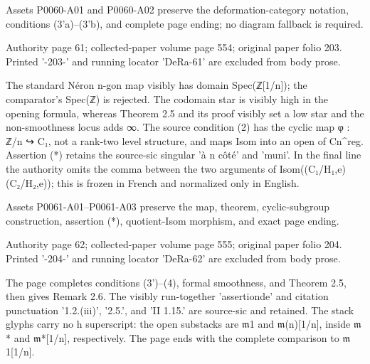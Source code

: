 \documentclass[11pt,a4paper]{article}
\begin{document}
Assets P0060-A01 and P0060-A02 preserve the deformation-category notation, conditions (3'a)--(3'b), and complete page ending; no diagram fallback is required.


\par\medskip
\hypertarget{D018-P0061}{}
\par\smallskip
Authority page 61; collected-paper volume page 554; original paper folio 203. Printed '-203-' and running locator 'DeRa-61' are excluded from body prose.

The standard Néron n-gon map visibly has domain Spec(ℤ[1/n]); the comparator's Spec(ℤ) is rejected. The codomain star is visibly high in the opening formula, whereas Theorem 2.5 and its proof visibly set a low star and the non-smoothness locus adds ∞. The source condition (2) has the cyclic map φ : ℤ/n ↪ C₁, not a rank-two level structure, and maps Isom into an open of C\textunderscore{}n\textasciicircum{}reg. Assertion (*) retains the source-sic singular 'à n côté' and 'muni'. In the final line the authority omits the comma between the two arguments of Isom((C₁/H₁,e)(C₂/H₂,e)); this is frozen in French and normalized only in English.

Assets P0061-A01--P0061-A03 preserve the map, theorem, cyclic-subgroup construction, assertion (*), quotient-Isom morphism, and exact page ending.


\par\medskip
\hypertarget{D018-P0062}{}
\par\smallskip
Authority page 62; collected-paper volume page 555; original paper folio 204. Printed '-204-' and running locator 'DeRa-62' are excluded from body prose.

The page completes conditions (3')--(4), formal smoothness, and Theorem 2.5, then gives Remark 2.6. The visibly run-together 'assertionde' and citation punctuation '1.2.(iii)', '2.5.', and 'II 1.15.' are source-sic and retained. The stack glyphs carry no h superscript: the open substacks are \ensuremath{\mathfrak{m}}\textunderscore{}1 and \ensuremath{\mathfrak{m}}\textunderscore{}(n)[1/n], inside \ensuremath{\mathfrak{m}}\textunderscore{}* and \ensuremath{\mathfrak{m}}\textunderscore{}*[1/n], respectively. The page ends with the complete comparison to \ensuremath{\mathfrak{m}}\textunderscore{}1[1/n].
\end{document}
